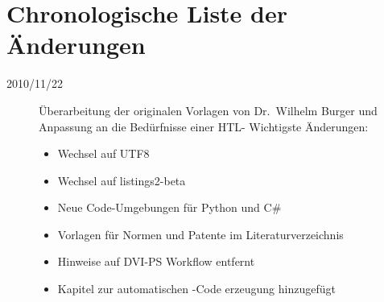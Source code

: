 \chapter{Chronologische Liste der Änderungen}

\begin{sloppypar}
\begin{description}

\item[2010/11/22]
Überarbeitung der originalen Vorlagen von Dr.\ Wilhelm Burger und Anpassung an
die Bedürfnisse einer HTL-
Wichtigste Änderungen:
\begin{itemize}
  \item Wechsel auf UTF8
  \item Wechsel auf listings2-beta
  \item Neue Code-Umgebungen für Python und C\#
  \item Vorlagen für Normen und Patente im Literaturverzeichnis
  \item Hinweise auf DVI-PS Workflow entfernt
  \item Kapitel zur automatischen \latex-Code erzeugung hinzugefügt
\end{itemize}
%
\end{description}

\end{sloppypar}




